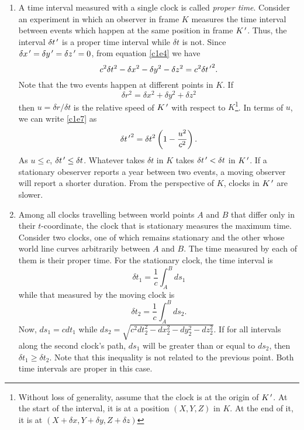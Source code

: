\begin{enumerate}
\item A time interval measured with a single clock is called \emph{proper time}.
Consider an experiment in which an observer in frame $K$ measures the time
interval between events which happen at the same position in frame $K^{\,\prime}$.
Thus, the interval $\delta t^{\,\prime}$ is a proper time interval while $\delta t$ is
not. Since $\delta x^{\,\prime} = \delta y^{\,\prime} = \delta z^{\,\prime} = 0$, from equation
\eqref{c1e4} we have
\begin{equation}\label{c1e7}
c^2\delta t^2 - \delta x^2 - \delta y^2 - \delta z^2 = c^2\delta {t^{\,\prime}}^2.
\end{equation}
Note that the two events happen at different points in $K$. If
\begin{equation}\label{c1e8}
\delta r^2 = \delta x^2 + \delta y^2 + \delta z^2
\end{equation}
then $u = \delta r/\delta t$ is the relative speed of $K^{\,\prime}$ with respect to
$K$\footnote{Without loss of generality, assume that the clock is at the origin
of $K^{\,\prime}$. At the start of the interval, it is at a position $(X, Y, Z)$ in 
$K$. At the end of it, it is at $(X + \delta x, Y + \delta y, Z + \delta z)$}.
In terms of $u$, we can write \eqref{c1e7} as
\begin{equation}\label{c1e9}
{\delta t^{\,\prime}}^2 = {\delta t}^2\left(1 - \frac{u^2}{c^2}\right).
\end{equation}
As $u \le c$, $\delta t^{\,\prime} \le \delta t$. Whatever takes $\delta t$ in $K$ 
takes $\delta t^{\,\prime} < \delta t$ in $K^{\,\prime}$. If a stationary obeserver reports
a year between two events, a moving observer will report a shorter duration.
From the perspective of $K$, clocks in $K^{\,\prime}$ are slower.

\item Among all clocks travelling between world points $A$ and $B$ that differ 
only in their $t$-coordinate, the clock that is stationary measures the maximum
time. Consider two clocks, one of which remains stationary and the other whose
world line curves arbitrarily between $A$ and $B$. The time measured by each of
them is their proper time. For the stationary clock, the time interval is
\begin{equation}\label{c1e10}
\delta t_1 = \frac{1}{c}\int_A^B ds_1
\end{equation}
while that measured by the moving clock is
\begin{equation}\label{c1e11}
\delta t_2 = \frac{1}{c}\int_A^B ds_2.
\end{equation}
Now, $ds_1 = cdt_1$ while $ds_2 = \sqrt{c^2dt_2^2 - dx_2^2 - dy_2^2 - dz_2^2}$.
If for all intervals along the second clock's path, $ds_1$ will be greater
than or equal to $ds_2$, then $\delta t_1 \ge \delta t_2$. Note that this 
inequality is not related to the previous point. Both time intervals are 
proper in this case.


\end{enumerate}

